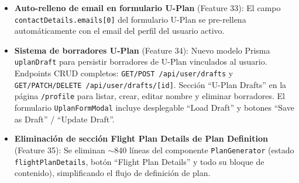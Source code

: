 \documentclass[12pt,a4paper]{article}
\begin{document}
\begin{itemize}
    \item \textbf{Auto-relleno de email en formulario U-Plan} (Feature 33): El campo \texttt{contactDetails.emails[0]} del formulario U-Plan se pre-rellena automáticamente con el email del perfil del usuario activo.
    \item \textbf{Sistema de borradores U-Plan} (Feature 34): Nuevo modelo Prisma \texttt{uplanDraft} para persistir borradores de U-Plan vinculados al usuario. Endpoints CRUD completos: \texttt{GET/POST /api/user/drafts} y \texttt{GET/PATCH/DELETE /api/user/drafts/[id]}. Sección ``U-Plan Drafts'' en la página \texttt{/profile} para listar, crear, editar nombre y eliminar borradores. El formulario \texttt{UplanFormModal} incluye desplegable ``Load Draft'' y botones ``Save as Draft'' / ``Update Draft''.
    \item \textbf{Eliminación de sección Flight Plan Details de Plan Definition} (Feature 35): Se eliminan $\sim$840 líneas del componente \texttt{PlanGenerator} (estado \texttt{flightPlanDetails}, botón ``Flight Plan Details'' y todo su bloque de contenido), simplificando el flujo de definición de plan.
\end{itemize}
\end{document}
